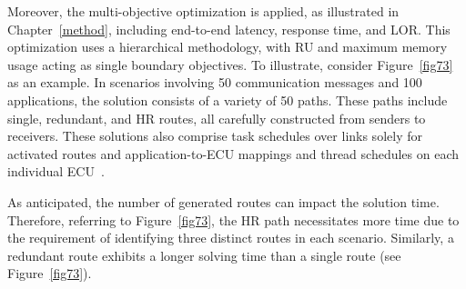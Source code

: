      
     
     
     
     Moreover, the multi-objective optimization is applied, as illustrated in Chapter~\ref{method}, including end-to-end latency, response time, and LOR. This optimization uses a hierarchical methodology, with RU and maximum memory usage acting as single boundary objectives.
     To illustrate, consider Figure~\ref{fig73} as an example. In scenarios involving 50 communication messages and 100 applications, the solution consists of a variety of 50 paths. These paths include single, redundant, and HR routes, all carefully constructed from senders to receivers. These solutions also comprise task schedules over links solely for activated routes and application-to-ECU mappings and thread schedules on each individual ECU~\cite{askaripoor2023designer}.
     
    
    As anticipated, the number of generated routes can impact the solution time. Therefore, referring to Figure~\ref{fig73}, the HR path necessitates more time due to the requirement of identifying three distinct routes in each scenario. Similarly, a redundant route exhibits a longer solving time than a single route (see Figure~\ref{fig73}).





    
